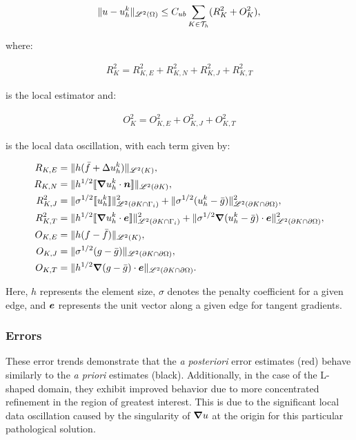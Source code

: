 \begin{gather}
	\lVert u - u^k_h \rVert_{\mathscr{L}^2(\Omega)} \leq C_{ub} \sum_{K \in \mathcal{T}_h} (R_K^2 + O_K^2),
\end{gather}

where:

\begin{gather}
	R_K^2 = R_{K, E}^2 + R_{K, N}^2 + R_{K, J}^2 + R_{K, T}^2
\end{gather}

is the local estimator and:

\begin{gather}
	O_K^2 = O_{K, E}^2 + O_{K, J}^2 + O_{K, T}^2
\end{gather}

is the local data oscillation, with each term given by:

\begin{align}
	R_{K, E} &= \lVert h (\bar{f} + \Delta u^k_h) \rVert_{\mathscr{L}^2(K)}, \\
	R_{K, N} &= \lVert h^{1/2} \llbracket \bm{\nabla} u^k_h \cdot \bm{n} \rrbracket \rVert_{\mathscr{L}^2(\partial K)}, \\
	R^2_{K, J} &= \lVert \sigma^{1/2} \llbracket u^k_h \rrbracket \rVert^2_{\mathscr{L}^2(\partial K \cap \Gamma_{i})} + \lVert \sigma^{1/2} (u^k_h - \bar{g}) \rVert^2_{\mathscr{L}^2(\partial K \cap \partial \Omega)}, \\
	R^2_{K, T} &= \lVert h^{1/2} \llbracket \bm{\nabla} u^k_h \cdot \bm{e} \rrbracket \rVert^2_{\mathscr{L}^2(\partial K \cap \Gamma_{i})} + \lVert \sigma^{1/2} \bm{\nabla} (u^k_h - \bar{g}) \cdot \bm{e} \rVert^2_{\mathscr{L}^2(\partial K \cap \partial \Omega)}, \\
	O_{K, E} &= \lVert h (f - \bar{f}) \rVert_{\mathscr{L}^2(K)}, \\
	O_{K, J} &= \lVert \sigma^{1/2} (g - \bar{g}) \rVert_{\mathscr{L}^2(\partial K \cap \partial \Omega)}, \\
	O_{K, T} &= \lVert h^{1/2} \bm{\nabla} (g - \bar{g}) \cdot \bm{e} \rVert_{\mathscr{L}^2(\partial K \cap \partial \Omega)}.
\end{align}

Here, $h$ represents the element size, $\sigma$ denotes the penalty coefficient for a given edge, and $\bm{e}$ represents the unit vector along a given edge for tangent gradients.

\newpage
\subsubsection{Errors}

These error trends demonstrate that the \textit{a posteriori} error estimates (red) behave similarly to the \textit{a priori} estimates (black). Additionally, in the case of the L-shaped domain, they exhibit improved behavior due to more concentrated refinement in the region of greatest interest. This is due to the significant local data oscillation caused by the singularity of $\bm{\nabla} u$ at the origin for this particular pathological solution.

